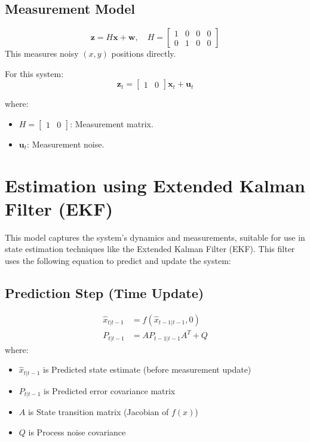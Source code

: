 \documentclass[a4paper,11pt]{article}
\begin{document}
\subsection*{Measurement Model}
\begin{equation*}
    \mathbf{z} = H\mathbf{x} + \mathbf{w}, \quad H =
    \begin{bmatrix}
        1 & 0 & 0 & 0 \\
        0 & 1 & 0 & 0
    \end{bmatrix}
\end{equation*}
This measures noisy $(x, y)$ positions directly.

For this system:
\[
\mathbf{z}_{t} =
\begin{bmatrix}
1 & 0
\end{bmatrix}
\mathbf{x}_t + \mathbf{u}_{t}
\]

where:
\begin{itemize}
    \item \( H = \begin{bmatrix} 1 & 0 \end{bmatrix} \): Measurement matrix.
    \item \( \mathbf{u}_{t} \): Measurement noise.
\end{itemize}

\section*{Estimation using Extended Kalman Filter (EKF)}

This model captures the system's dynamics and measurements, suitable for use in state estimation techniques like the Extended Kalman Filter (EKF). This filter uses the following equation to predict and update the system: 
\subsection*{Prediction Step (Time Update)}
\begin{align*}
\hat{x}_{t|t-1} &= f(\hat{x}_{t-1|t-1}, 0) \\
P_{t|t-1} &= A P_{t-1|t-1} A^T + Q
\end{align*}
where: 
\begin{itemize}
    \item \( \hat{x}_{t|t-1} \) is Predicted state estimate (before measurement update)
    \item \( P_{t|t-1} \) is Predicted error covariance matrix
    \item \( A \) is State transition matrix (Jacobian of \( f(x) \))
    \item \( Q \) is Process noise covariance
\end{itemize}
\end{document}

